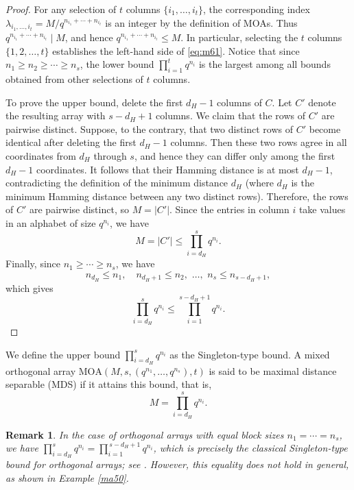 \documentclass[11pt]{article}
\newtheorem{Remark}[Theorem]{Remark}
\newtheorem{Definition and Notation}[Theorem]{Definition and Notation}
\begin{document}
\begin{proof}
For any selection of $t$ columns $\{i_1,\dots,i_t\}$, the corresponding index $\lambda_{i_1,\ldots,i_t}= M/q^{n_{i_1} + \cdots + n_{i_t}}$ is an integer by the definition of MOAs. Thus $q^{n_{i_1}+\cdots+n_{i_t}}\mid M $, and hence $q^{n_{i_1}+\cdots+n_{i_t}}\leq M$. In particular, selecting the $t$ columns $\{1,2,\dots,t\}$ establishes the left-hand side of \eqref{eq:m61}. Notice that since $n_1\ge n_2\ge\cdots\ge n_s$, the lower bound $\prod_{i=1}^{t} q^{n_i}$ is the largest among all bounds obtained from other selections of $t$ columns.

To prove the upper bound, delete the first $d_H-1$ columns of $C$. Let $C'$ denote the resulting array with $s-d_H+1$ columns. We claim that the rows of $C'$ are pairwise distinct. Suppose, to the contrary, that two distinct rows of $C'$ become identical after deleting the first $d_H-1$ columns. Then these two rows agree in all coordinates from $d_H$ through $s$, and hence they can differ only among the first $d_H-1$ coordinates. It follows that their Hamming distance is at most $d_H-1$, contradicting the definition of the minimum distance $d_H$ (where $d_H$ is the minimum Hamming distance between any two distinct rows).
Therefore, the rows of $C'$ are pairwise distinct, so $M=|C'|$. Since the entries in column $i$ take values in an alphabet of size $q^{n_i}$, we have
\begin{equation}
    M=|C'| \leq \prod_{i=d_H}^{s} q^{n_i}.
\end{equation}
Finally, since $n_1\ge\cdots\ge n_s$, we have
$$
n_{d_H}\le n_1,\quad n_{d_H+1}\le n_2,\,\,\dots,\,\, n_s\le n_{s-d_H+1},
$$
which gives
$$
\prod_{i=d_H}^s q^{n_i}\le\prod_{i=1}^{s-d_H+1} q^{n_i}.
$$
\end{proof}
We define the upper bound $\prod_{i=d_H}^{s} q^{n_i}$ as the Singleton-type bound. A mixed orthogonal array $\mathrm{MOA}(M, s, (q^{n_1},\dots, q^{n_s}), t)$ is said to be maximal distance separable (MDS) if it attains this bound, that is,
$$M=\prod_{i=d_H}^{s} q^{n_i}.$$

\begin{Remark}
In the case of orthogonal arrays with equal block sizes $n_1 = \cdots = n_s$,  we have $ \prod_{i=d_H}^{s} q^{n_i} = \prod_{i=1}^{\,s-d_H+1} q^{n_i}$, which is precisely the classical Singleton-type bound for orthogonal arrays; see \cite[Theorem 4.20]{HSS2012}. However, this equality does not hold in general, as shown in Example \ref{ma50}.
\end{Remark}
\end{document}
